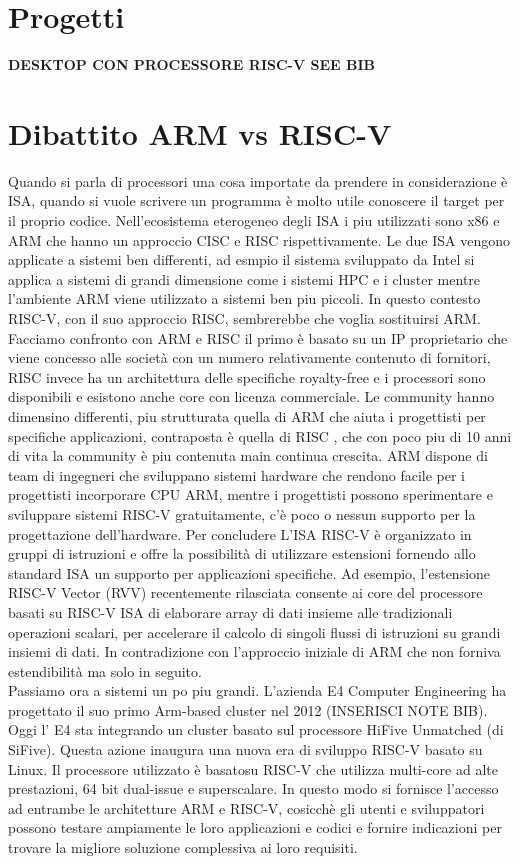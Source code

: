 \documentclass[12pt,a4paper]{report}
\begin{document}
\chapter{Progetti}


\textbf{DESKTOP CON PROCESSORE RISC-V SEE BIB}

\chapter{Dibattito ARM vs RISC-V}

Quando si parla di processori una cosa importate da prendere in considerazione è ISA, quando si vuole scrivere un programma è molto utile conoscere il target per il proprio codice. Nell'ecosistema eterogeneo degli ISA i piu utilizzati sono x86 e ARM che hanno un approccio CISC e RISC rispettivamente. Le due ISA vengono applicate a sistemi ben differenti, ad esmpio il sistema sviluppato da Intel si applica a sistemi di grandi dimensione  come i sistemi HPC e i cluster mentre l'ambiente ARM viene utilizzato a sistemi ben piu piccoli. In questo contesto RISC-V, con il suo approccio RISC, sembrerebbe che voglia sostituirsi  ARM. \\
Facciamo confronto con ARM e RISC il primo è basato su un IP proprietario che viene concesso alle società con un numero relativamente contenuto di fornitori, RISC invece ha un architettura delle specifiche royalty-free e i processori sono disponibili e esistono anche core con licenza commerciale. Le community hanno dimensino differenti, piu strutturata quella di ARM che aiuta i progettisti per specifiche applicazioni, contraposta è quella di RISC , che con poco piu di 10 anni di vita la community è piu contenuta main continua crescita. ARM dispone di team di ingegneri che sviluppano sistemi hardware che rendono facile per i progettisti incorporare CPU ARM, mentre i progettisti possono sperimentare e sviluppare sistemi RISC-V gratuitamente, c’è poco o nessun supporto per la progettazione dell’hardware. Per concludere L’ISA RISC-V è organizzato in gruppi di istruzioni  e offre la possibilità di utilizzare estensioni fornendo allo standard ISA  un supporto per applicazioni specifiche. Ad esempio, l’estensione RISC-V Vector (RVV) recentemente rilasciata consente ai core del processore basati su RISC-V ISA di elaborare array di dati insieme alle tradizionali operazioni scalari, per accelerare il calcolo di singoli flussi di istruzioni su grandi insiemi di dati.  In contradizione con l'approccio iniziale di ARM che non forniva estendibilità ma solo in seguito.\\
Passiamo ora a sistemi un po piu grandi.  L'azienda E4 Computer Engineering ha progettato il suo primo Arm-based cluster nel 2012 (INSERISCI NOTE BIB).  Oggi l' E4 sta  integrando un cluster basato sul processore HiFive Unmatched (di SiFive). Questa azione inaugura una nuova era di sviluppo RISC-V basato su Linux. Il processore utilizzato è basatosu RISC-V che utilizza multi-core ad alte prestazioni, 64 bit dual-issue e superscalare.  In questo modo si fornisce l’accesso ad entrambe le architetture ARM e RISC-V, cosicchè gli utenti e sviluppatori possono testare ampiamente le loro applicazioni e codici e fornire indicazioni per trovare la migliore soluzione complessiva ai loro requisiti.
\end{document}
